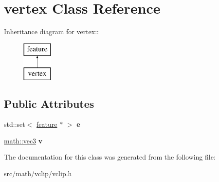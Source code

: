 \hypertarget{classvertex}{
\section{vertex Class Reference}
\label{classvertex}
}
Inheritance diagram for vertex::\begin{figure}[H]
\begin{center}
\leavevmode
\includegraphics[height=2cm]{classvertex}
\end{center}
\end{figure}
\subsection*{Public Attributes}
\begin{DoxyCompactItemize}
\item 
\hypertarget{classvertex_a0cfa1be3d73ef4d1cd4a546f6c4b9b5d}{
std::set$<$ \hyperlink{classfeature}{feature} $\ast$ $>$ {\bfseries e}}
\label{classvertex_a0cfa1be3d73ef4d1cd4a546f6c4b9b5d}

\item 
\hypertarget{classvertex_a2eef2e5986bdf55647bfecbcb55ed474}{
\hyperlink{classmath_1_1vec3}{math::vec3} {\bfseries v}}
\label{classvertex_a2eef2e5986bdf55647bfecbcb55ed474}

\end{DoxyCompactItemize}


The documentation for this class was generated from the following file:\begin{DoxyCompactItemize}
\item 
src/math/vclip/vclip.h\end{DoxyCompactItemize}
